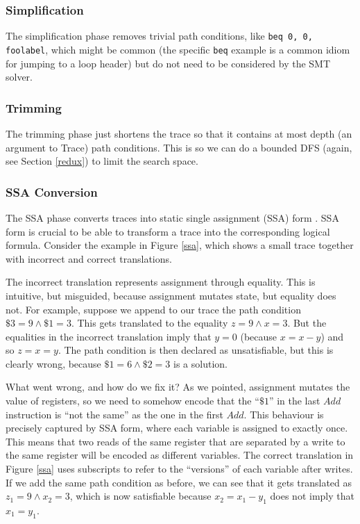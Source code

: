 \documentclass{llncs}
\begin{document}
\subsubsection{Simplification}

The simplification phase removes trivial path conditions, like \lstinline{beq 0, 0, foolabel}, which might be common (the specific \lstinline{beq} example is a common idiom for jumping to a loop header) but do not need to be considered by the SMT solver.

\subsubsection{Trimming}

The trimming phase just shortens the trace so that it contains at most \textsf{depth} (an argument to \textsf{Trace}) path conditions. This is so we can do a bounded DFS (again, see Section \ref{redux}) to limit the search space.

\subsubsection{SSA Conversion}
\label{ssaconv}

The SSA phase converts traces into static single assignment (SSA) form \cite{cytron1991efficiently}. SSA form is crucial to be able to transform a trace into the corresponding logical formula. Consider the example in Figure \ref{ssa}, which shows a small trace together with incorrect and correct translations.

The incorrect translation represents assignment through equality. This is intuitive, but misguided, because assignment mutates state, but equality does not. For example, suppose we append to our trace the path condition $\$3 = 9 \land \$1 = 3$. This gets translated to the equality $z = 9 \land x = 3$. But the equalities in the incorrect translation imply that $y = 0$ (because $x = x - y$) and so $z = x = y$. The path condition is then declared as unsatisfiable, but this is clearly wrong, because $\$1 = 6 \land \$2 = 3$ is a solution. 

What went wrong, and how do we fix it? As we pointed, assignment mutates the value of registers, so we need to somehow encode that the ``$\$1$'' in the last $Add$ instruction is ``not the same'' as the one in the first $Add$. This behaviour is precisely captured by SSA form, where each variable is assigned to exactly once. This means that two reads of the same register that are separated by a write to the same register will be encoded as different variables. The correct translation in Figure \ref{ssa} uses subscripts to refer to the ``versions'' of each variable after writes. If we add the same path condition as before, we can see that it gets translated as $z_1 = 9 \land x_2 = 3$, which is now satisfiable because $x_2 = x_1 - y_1$ does not imply that $x_1 = y_1$.
\end{document}
